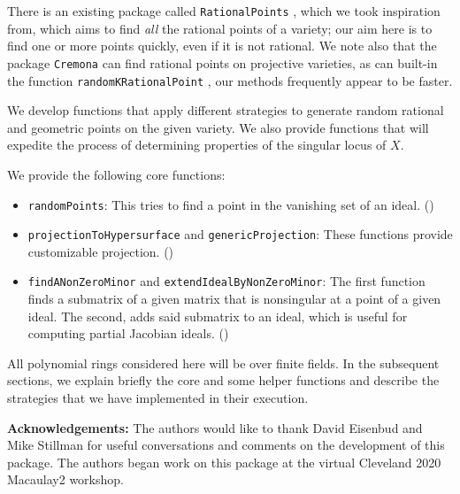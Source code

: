 \documentclass[11pt]{amsart}
\theoremstyle{definition}
\begin{document}
    There is an existing package called {\tt RationalPoints} \cite{RationalPointsSource}, which we took inspiration from, which aims to find \emph{all} the rational points of a variety; our aim here is to find one or more points quickly, even if it is not rational.  We note also that the package {\tt Cremona} \cite{CremonaSource} can find rational points on projective varieties, as can built-in the function {\tt randomKRationalPoint} \cite{M2}, our methods frequently appear to be faster.

    We develop functions that apply different strategies to generate random rational and geometric points on the given variety. We also provide functions that will expedite the process of determining properties of the singular locus of $X$.%

    We provide the following core functions:
    \begin{itemize}    
    \item {\tt randomPoints}:  This tries to find a point in the vanishing set of an ideal. ()
    \item {\tt projectionToHypersurface} and {\tt genericProjection}: These functions provide customizable projection. () 	
    \item {\tt findANonZeroMinor} and {\tt extendIdealByNonZeroMinor}:  The first function finds a submatrix of a given matrix that is nonsingular at a point of a given ideal.  The second, adds said submatrix to an ideal, which is useful for computing partial Jacobian ideals.  ()          
    \end{itemize}

    All polynomial rings considered here will be over finite fields. In the subsequent sections, we explain briefly the core and some helper functions and describe the strategies that we have implemented in their execution.

    \vspace{1em}
    \noindent \textbf{Acknowledgements:} The authors would like to thank David Eisenbud and Mike Stillman for useful conversations and comments on the development of this package.  The authors began work on this package at the virtual Cleveland 2020 Macaulay2 workshop.
\end{document}
